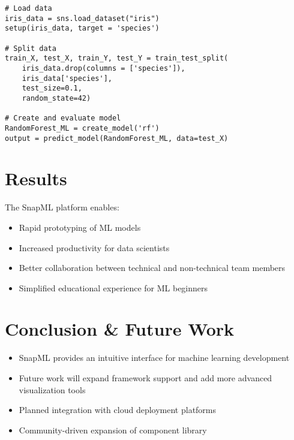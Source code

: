 \documentclass[a0]{sciposter}
\begin{document}
\begin{multicols}{3}
\begin{lstlisting}
# Load data
iris_data = sns.load_dataset("iris")
setup(iris_data, target = 'species')

# Split data
train_X, test_X, train_Y, test_Y = train_test_split(
    iris_data.drop(columns = ['species']),
    iris_data['species'], 
    test_size=0.1, 
    random_state=42)
    
# Create and evaluate model
RandomForest_ML = create_model('rf')
output = predict_model(RandomForest_ML, data=test_X)
    \end{lstlisting}
    
    \section{Results}
    The SnapML platform enables:
    \begin{itemize}
        \item Rapid prototyping of ML models
        \item Increased productivity for data scientists
        \item Better collaboration between technical and non-technical team members
        \item Simplified educational experience for ML beginners
    \end{itemize}
    
    \section{Conclusion \& Future Work}
    \begin{itemize}
        \item SnapML provides an intuitive interface for machine learning development
        \item Future work will expand framework support and add more advanced visualization tools
        \item Planned integration with cloud deployment platforms
        \item Community-driven expansion of component library
    \end{itemize}
\end{multicols}
\end{document}
